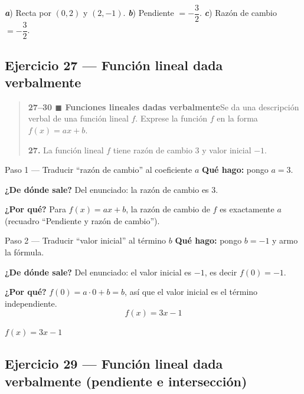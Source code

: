 \documentclass[11pt]{article}
\begin{document}
\begin{resp}
\textbf{\textit{a}}) Recta por $(0,2)$ y $(2,-1)$. \quad \textbf{\textit{b}}) Pendiente $=-\dfrac32$. \quad \textbf{\textit{c}}) Razón de cambio $=-\dfrac32$.
\end{resp}

\subsection*{Ejercicio 27 — Función lineal dada verbalmente}

\begin{quote}
\textbf{27--30 $\blacksquare$ Funciones lineales dadas verbalmente}\quad Se da una descripción verbal de una función lineal $f$. Exprese la función $f$ en la forma $f(x)=ax+b$.

\textbf{27.} La función lineal $f$ tiene razón de cambio 3 y valor inicial $-1$.
\end{quote}

\begin{paso}{Paso 1 --- Traducir ``razón de cambio'' al coeficiente $a$}
\textbf{Qué hago:} pongo $a=3$.

\textbf{¿De dónde sale?} Del enunciado: la razón de cambio es $3$.

\textbf{¿Por qué?} Para $f(x)=ax+b$, la razón de cambio de $f$ es exactamente $a$ (recuadro ``Pendiente y razón de cambio'').
\end{paso}

\begin{paso}{Paso 2 --- Traducir ``valor inicial'' al término $b$}
\textbf{Qué hago:} pongo $b=-1$ y armo la fórmula.

\textbf{¿De dónde sale?} Del enunciado: el valor inicial es $-1$, es decir $f(0)=-1$.

\textbf{¿Por qué?} $f(0)=a\cdot 0+b=b$, así que el valor inicial es el término independiente.
\[
f(x)=3x-1
\]
\end{paso}

\begin{resp}
$f(x)=3x-1$
\end{resp}

\subsection*{Ejercicio 29 — Función lineal dada verbalmente (pendiente e intersección)}
\end{document}
